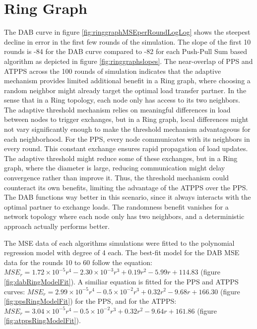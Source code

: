 \section{Ring Graph}\label{sec:ringgraph}
The DAB curve in figure \ref{fig:ringgraphMSEperRoundLogLog} shows the steepest decline in error in the first few rounds of the simulation. The slope of the first 10 rounds is -84 for the DAB curve compared to -82 for each Push-Pull Sum based algorithm as depicted in figure \ref{fig:ringgraphslopes}. The near-overlap of PPS and ATPPS across the 100 rounds of simulation indicates that the adaptive mechanism provides limited additional benefit in a Ring graph, where choosing a random neighbor might already target the optimal load transfer partner. In the sense that in a Ring topology, each node only has access to its two neighbors. The adaptive threshold mechanism relies on meaningful differences in load between nodes to trigger exchanges, but in a Ring graph, local differences might not vary significantly enough to make the threshold mechanism advantageous for each neighborhood. For the PPS, every node communicates with its neighbors in every round. This constant exchange ensures rapid propagation of load updates. The adaptive threshold might reduce some of these exchanges, but in a Ring graph, where the diameter is large, reducing communication might delay convergence rather than improve it. Thus, the threshold mechanism could counteract its own benefits, limiting the advantage of the ATPPS over the PPS. The DAB functions way better in this scenario, since it always interacts with the optimal partner to exchange loads. The randomness benefit vanishes for a network topology where each node only has two neighbors, and a deterministic approach actually performs better.

The MSE data of each algorithms simulations were fitted to the polynomial regression model with degree of 4 each. The best-fit model for the DAB MSE data for the rounds 10 to 60 follow the equation: $MSE_r=1.72\times 10^{-5}r^{4}-2.30\times 10^{-3}r^{3}+ 0.19r^{2}-5.99r+114.83$ (figure \ref{fig:dabRingModelFit}). A similiar equation is fitted for the PPS and ATPPS curves: $MSE_r= 2.99\times 10^{-5}r^{4}-0.5\times 10^{-2}r^{3} + 0.32r^{2} -9.68r + 166.30$ (figure \ref{fig:ppsRingModelFit}) for the PPS, and for the ATPPS: $MSE_r=3.04\times 10^{-5}r^{4}-0.5\times 10^{-2}r^{3} + 0.32r^{2}-9.64r+161.86$ (figure \ref{fig:atppsRingModelFit}).

